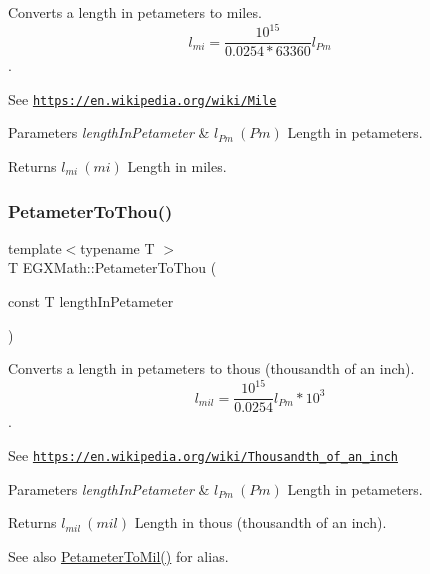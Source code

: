 Converts a length in petameters to miles. \[ l_{mi}=\frac{10^{15}}{0.0254 * 63360} l_{Pm} \]. 

See \href{https://en.wikipedia.org/wiki/Mile}{\tt https\+://en.\+wikipedia.\+org/wiki/\+Mile} 
\begin{DoxyParams}{Parameters}
{\em length\+In\+Petameter} & $ l_{Pm}\ (Pm)$ Length in petameters. \\
\hline
\end{DoxyParams}
\begin{DoxyReturn}{Returns}
$ l_{mi}\ (mi)$ Length in miles. 
\end{DoxyReturn}
\mbox{\label{group___e_g_x_math-_conversions-_length_conversions-_petameter-_imperial_gadcb69779fdf2696d6b9e13e2b23e6216}} 
\subsubsection{\texorpdfstring{Petameter\+To\+Thou()}{PetameterToThou()}}
{\footnotesize\ttfamily template$<$typename T $>$ \\
T E\+G\+X\+Math\+::\+Petameter\+To\+Thou (\begin{DoxyParamCaption}\item[{const T}]{length\+In\+Petameter }\end{DoxyParamCaption})}



Converts a length in petameters to thous (thousandth of an inch). \[ l_{mil}= \frac{10^{15}}{0.0254} l_{Pm} * 10^{3} \]. 

See \href{https://en.wikipedia.org/wiki/Thousandth_of_an_inch}{\tt https\+://en.\+wikipedia.\+org/wiki/\+Thousandth\+\_\+of\+\_\+an\+\_\+inch} 
\begin{DoxyParams}{Parameters}
{\em length\+In\+Petameter} & $ l_{Pm}\ (Pm)$ Length in petameters. \\
\hline
\end{DoxyParams}
\begin{DoxyReturn}{Returns}
$ l_{mil}\ (mil)$ Length in thous (thousandth of an inch). 
\end{DoxyReturn}
\begin{DoxySeeAlso}{See also}
\mbox{\hyperlink{group___e_g_x_math-_conversions-_length_conversions-_petameter-_imperial_ga044a0e99c9e8335dc196daf1efb9c90f}{Petameter\+To\+Mil()}} for alias. 
\end{DoxySeeAlso}
\mbox{\label{group___e_g_x_math-_conversions-_length_conversions-_petameter-_imperial_gadd453d20eef89db280c71397046d5dcd}} 
